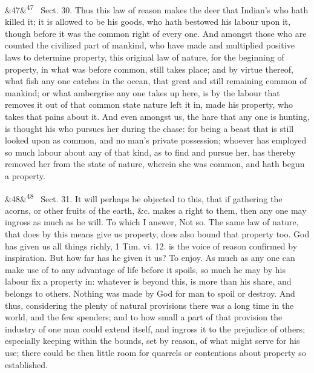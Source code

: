 \documentclass[12pt]{article}
\newcommand{\para}[1][]{\par\noindent\ifx&#1&\else\textsuperscript{\footnotesize #1}~\fi}
\begin{document}
\para[47] Sect. 30. Thus this law of reason makes the deer that Indian's who hath killed it; it is allowed to be his goods, who hath bestowed his labour upon it, though before it was the common right of every one. And amongst those who are counted the civilized part of mankind, who have made and multiplied positive laws to determine property, this original law of nature, for the beginning of property, in what was before common, still takes place; and by virtue thereof, what fish any one catches in the ocean, that great and still remaining common of mankind; or what ambergrise any one takes up here, is by the labour that removes it out of that common state nature left it in, made his property, who takes that pains about it. And even amongst us, the hare that any one is hunting, is thought his who pursues her during the chase: for being a beast that is still looked upon as common, and no man's private possession; whoever has employed so much labour about any of that kind, as to find and pursue her, has thereby removed her from the state of nature, wherein she was common, and hath begun a property.

\para[48] Sect. 31. It will perhaps be objected to this, that if gathering the acorns, or other fruits of the earth, \&c. makes a right to them, then any one may ingross as much as he will. To which I answer, Not so. The same law of nature, that does by this means give us property, does also bound that property too. God has given us all things richly, 1 Tim. vi. 12. is the voice of reason confirmed by inspiration. But how far has he given it us? To enjoy. As much as any one can make use of to any advantage of life before it spoils, so much he may by his labour fix a property in: whatever is beyond this, is more than his share, and belongs to others. Nothing was made by God for man to spoil or destroy. And thus, considering the plenty of natural provisions there was a long time in the world, and the few spenders; and to how small a part of that provision the industry of one man could extend itself, and ingross it to the prejudice of others; especially keeping within the bounds, set by reason, of what might serve for his use; there could be then little room for quarrels or contentions about property so established.
\end{document}
